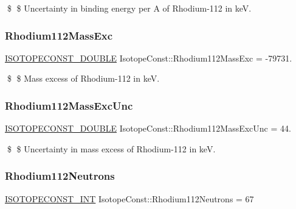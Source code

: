 \$ \$ Uncertainty in binding energy per A of Rhodium-\/112 in keV. \mbox{\label{group___isotope_const-_rhodium-_rh112_ga89bf718d9dc745e9322f7d7adfa1b60e}} 
\subsubsection{\texorpdfstring{Rhodium112\+Mass\+Exc}{Rhodium112MassExc}}
{\footnotesize\ttfamily \mbox{\hyperlink{group___isotope_const-_macros_ga8f45a7272ce02c0b4c65c44636ed719a}{I\+S\+O\+T\+O\+P\+E\+C\+O\+N\+S\+T\+\_\+\+D\+O\+U\+B\+LE}} Isotope\+Const\+::\+Rhodium112\+Mass\+Exc = -\/79731.}

\$ \$ Mass excess of Rhodium-\/112 in keV. \mbox{\label{group___isotope_const-_rhodium-_rh112_ga6e72b926899a13e22d7191913882ef4e}} 
\subsubsection{\texorpdfstring{Rhodium112\+Mass\+Exc\+Unc}{Rhodium112MassExcUnc}}
{\footnotesize\ttfamily \mbox{\hyperlink{group___isotope_const-_macros_ga8f45a7272ce02c0b4c65c44636ed719a}{I\+S\+O\+T\+O\+P\+E\+C\+O\+N\+S\+T\+\_\+\+D\+O\+U\+B\+LE}} Isotope\+Const\+::\+Rhodium112\+Mass\+Exc\+Unc = 44.}

\$ \$ Uncertainty in mass excess of Rhodium-\/112 in keV. \mbox{\label{group___isotope_const-_rhodium-_rh112_gad8a7bfcdfffb77ea4bcd04d64e7b4223}} 
\subsubsection{\texorpdfstring{Rhodium112\+Neutrons}{Rhodium112Neutrons}}
{\footnotesize\ttfamily \mbox{\hyperlink{group___isotope_const-_macros_ga5f18360b3e99483a35c32d789e62621c}{I\+S\+O\+T\+O\+P\+E\+C\+O\+N\+S\+T\+\_\+\+I\+NT}} Isotope\+Const\+::\+Rhodium112\+Neutrons = 67}


